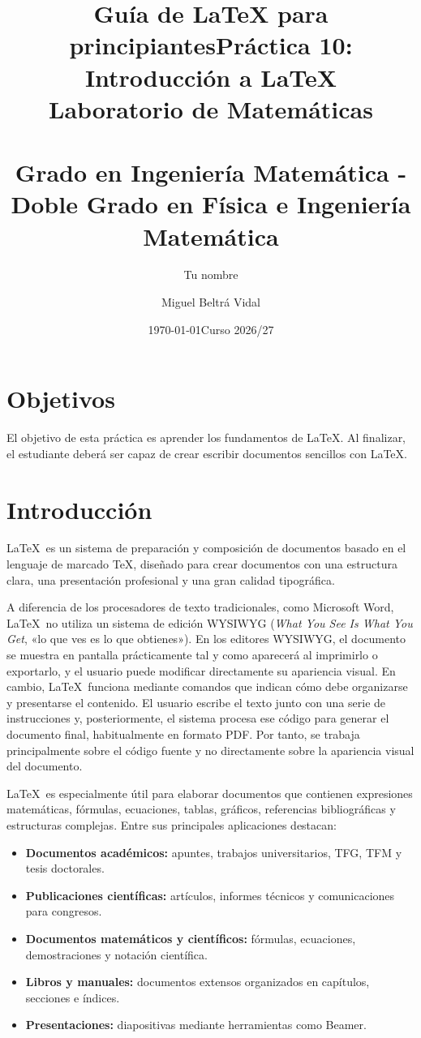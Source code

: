 \documentclass[11pt,a4paper]{article}
\title{Guía de LaTeX para principiantes}
\author{Tu nombre}
\date{\today}
\title{\LARGE\textbf{Práctica 10: Introducción a \LaTeX}\\[0.5em]
\Large Laboratorio de Matemáticas\\
\small\ \\
\Large Grado en Ingeniería Matemática - Doble Grado en Física e Ingeniería Matemática}
\author{Miguel Beltrá Vidal}
\date{Curso 2026/27}
\theoremstyle{exercise}
\begin{document}
\maketitle


\section{Objetivos}

El objetivo de esta práctica es aprender los fundamentos de \LaTeX. Al finalizar, el estudiante deberá ser capaz de crear escribir documentos sencillos con \LaTeX.





\section{Introducción}

\LaTeX\ es un sistema de preparación y composición de documentos basado en el lenguaje de marcado \TeX, diseñado para crear documentos con una estructura clara, una presentación profesional y una gran calidad tipográfica. 


A diferencia de los procesadores de texto tradicionales, como Microsoft Word, \LaTeX\ no utiliza un sistema de edición WYSIWYG (\emph{What You See Is What You Get}, «lo que ves es lo que obtienes»). En los editores WYSIWYG, el documento se muestra en pantalla prácticamente tal y como aparecerá al imprimirlo o exportarlo, y el usuario puede modificar directamente su apariencia visual. En cambio, \LaTeX\ funciona mediante comandos que indican cómo debe organizarse y presentarse el contenido. El usuario escribe el texto junto con una serie de instrucciones y, posteriormente, el sistema procesa ese código para generar el documento final, habitualmente en formato PDF. Por tanto, se trabaja principalmente sobre el código fuente y no directamente sobre la apariencia visual del documento.

\LaTeX\ es especialmente útil para elaborar documentos que contienen expresiones matemáticas, fórmulas, ecuaciones, tablas, gráficos, referencias bibliográficas y estructuras complejas. Entre sus principales aplicaciones destacan:
\begin{itemize}
	\item \textbf{Documentos académicos:} apuntes, trabajos universitarios, TFG, TFM y tesis doctorales.
	\item \textbf{Publicaciones científicas:} artículos, informes técnicos y comunicaciones para congresos.
	\item \textbf{Documentos matemáticos y científicos:} fórmulas, ecuaciones, demostraciones y notación científica.
	\item \textbf{Libros y manuales:} documentos extensos organizados en capítulos, secciones e índices.
	\item \textbf{Presentaciones:} diapositivas mediante herramientas como Beamer.
\end{itemize}
\end{document}
